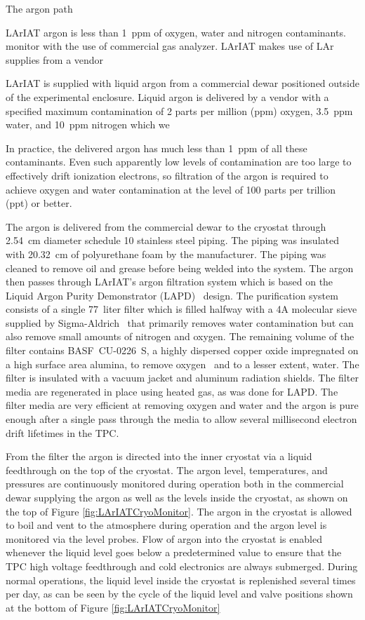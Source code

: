 The argon path

LArIAT argon is less than  1~ppm of oxygen, water and nitrogen contaminants.
monitor with the use of  commercial gas analyzer.
LArIAT makes use of LAr supplies from a vendor 

LArIAT is supplied with liquid argon from a commercial dewar positioned outside of the experimental enclosure.  
Liquid argon is delivered by a vendor with a specified maximum contamination of 2 parts per million (ppm) oxygen, 3.5~ppm water, and 10~ppm nitrogen which we 


In practice, the delivered argon has much less than 1~ppm of all these contaminants.  Even such apparently low levels of contamination are too large to effectively drift ionization electrons, so filtration of the argon is required to achieve oxygen and water contamination at the level of 100 parts per trillion (ppt) or better. 

The argon is delivered from the commercial dewar to the cryostat through 2.54~cm diameter schedule 10 stainless steel piping.  The piping was insulated with 20.32~cm of polyurethane foam by the manufacturer.  The piping was cleaned to remove oil and grease before being welded into the system. The argon then passes through LArIAT's argon filtration system which is based on the Liquid Argon Purity Demonstrator (LAPD)~\cite{LAPD} design. The purification system consists of a single 77~liter filter which is filled halfway with a 4A molecular sieve supplied by Sigma-Aldrich~\cite{sigma-aldrich} that primarily removes water contamination but can also remove small amounts of nitrogen and oxygen. The remaining volume of the filter contains BASF~CU-0226~S, a highly dispersed copper oxide impregnated on a high surface area alumina, to remove oxygen~\cite{basf} and to a lesser extent, water.  The filter is insulated with a vacuum jacket and aluminum radiation shields.  The filter media are regenerated in place using heated gas, as was done for LAPD. The filter media are very efficient at removing oxygen and water and the argon is pure enough after a single pass through the media to allow several millisecond electron drift lifetimes in the TPC. 

From the filter the argon is directed into the inner cryostat via a liquid feedthrough on the top of the cryostat. The argon level, temperatures, and pressures are continuously monitored during operation both in the commercial dewar supplying the argon as well as the levels inside the cryostat, as shown on the top of Figure \ref{fig:LArIATCryoMonitor}. The argon in the cryostat is allowed to boil and vent to the atmosphere during operation and the argon level is monitored via the level probes. Flow of argon into the cryostat is enabled whenever the liquid level goes below a predetermined value to ensure that the TPC high voltage feedthrough and cold electronics are always submerged. During normal operations, the liquid level inside the cryostat is replenished several times per day, as can be seen by the cycle of the liquid level and valve positions shown at the bottom of Figure \ref{fig:LArIATCryoMonitor} 

